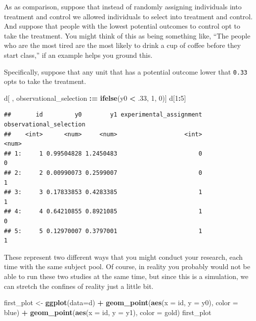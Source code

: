 \documentclass[
]{article}
\newenvironment{Shaded}{\begin{snugshade}}{\end{snugshade}}
\newcommand{\AttributeTok}[1]{\textcolor[rgb]{0.13,0.29,0.53}{#1}}
\newcommand{\DecValTok}[1]{\textcolor[rgb]{0.00,0.00,0.81}{#1}}
\newcommand{\FunctionTok}[1]{\textcolor[rgb]{0.13,0.29,0.53}{\textbf{#1}}}
\newcommand{\NormalTok}[1]{#1}
\newcommand{\OtherTok}[1]{\textcolor[rgb]{0.56,0.35,0.01}{#1}}
\newcommand{\SpecialCharTok}[1]{\textcolor[rgb]{0.81,0.36,0.00}{\textbf{#1}}}
\theoremstyle{definition}
\theoremstyle{definition}
\theoremstyle{definition}
\theoremstyle{definition}
\theoremstyle{remark}
\begin{document}
As as comparison, suppose that instead of randomly assigning individuals into treatment and control we allowed individuals to select into treatment and control. And suppose that people with the lowest potential outcomes to control opt to take the treatment. You might think of this as being something like, ``The people who are the most tired are the most likely to drink a cup of coffee before they start class,'' if an example helps you ground this.

Specifically, suppose that any unit that has a potential outcome lower that \texttt{0.33} opts to take the treatment.

\begin{Shaded}
\begin{Highlighting}[]
\NormalTok{d[ , observational\_selection }\SpecialCharTok{:=} \FunctionTok{ifelse}\NormalTok{(y0 }\SpecialCharTok{\textless{}}\NormalTok{ .}\DecValTok{33}\NormalTok{, }\DecValTok{1}\NormalTok{, }\DecValTok{0}\NormalTok{)]}
\NormalTok{d[}\DecValTok{1}\SpecialCharTok{:}\DecValTok{5}\NormalTok{]}
\end{Highlighting}
\end{Shaded}

\begin{verbatim}
##       id         y0        y1 experimental_assignment observational_selection
##    <int>      <num>     <num>                   <int>                   <num>
## 1:     1 0.99504828 1.2450483                       0                       0
## 2:     2 0.00990073 0.2599007                       0                       1
## 3:     3 0.17833853 0.4283385                       1                       1
## 4:     4 0.64210855 0.8921085                       1                       0
## 5:     5 0.12970007 0.3797001                       1                       1
\end{verbatim}

These represent two different ways that you might conduct your research, each time with the same subject pool. Of course, in reality you probably would not be able to run these two studies at the same time, but since this is a simulation, we can stretch the confines of reality just a little bit.

\begin{Shaded}
\begin{Highlighting}[]
\NormalTok{first\_plot }\OtherTok{\textless{}{-}} \FunctionTok{ggplot}\NormalTok{(}\AttributeTok{data=}\NormalTok{d) }\SpecialCharTok{+} 
  \FunctionTok{geom\_point}\NormalTok{(}\FunctionTok{aes}\NormalTok{(}\AttributeTok{x =}\NormalTok{ id, }\AttributeTok{y =}\NormalTok{ y0), }\AttributeTok{color =}\NormalTok{ blue) }\SpecialCharTok{+} 
  \FunctionTok{geom\_point}\NormalTok{(}\FunctionTok{aes}\NormalTok{(}\AttributeTok{x =}\NormalTok{ id, }\AttributeTok{y =}\NormalTok{ y1), }\AttributeTok{color =}\NormalTok{ gold)}
\NormalTok{first\_plot  }
\end{Highlighting}
\end{Shaded}
\end{document}
